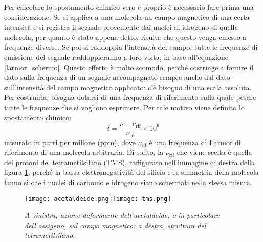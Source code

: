 \documentclass{report}
\newcommand{\figref}[1]{figura \ref{#1}}
\renewcommand{\eqref}[1]{equazione \ref{#1}}
\numberwithin{equation}{section}
\numberwithin{figure}{section}
\begin{document}
Per calcolare lo spostamento chimico vero e proprio è necessario fare prima una considerazione. Se si applica a una molecola un campo magnetico di una certa intensità e si registra il segnale proveniente dai nuclei di idrogeno di quella molecola, per quanto è stato appena detto, risulta che questo venga emesso a frequenze diverse. Se poi si raddoppia l'intensità del campo, tutte le frequenze di emissione del segnale raddoppieranno a loro volta, in base all'\eqref{larmor_schermo}. Questo effetto è molto scomodo, perché costringe a fornire il dato sulla frequenza di un segnale accompagnato sempre anche dal dato sull'intensità del campo magnetico applicato: c'è bisogno di una scala assoluta. Per costruirla, bisogna dotarsi di una frequenza di riferimento sulla quale pesare tutte le frequenze che si vogliono esprimere. Per tale motivo viene definito lo spostamento chimico:
\begin{equation}
    \boxed{\delta = \dfrac{\nu - \nu_{\mathrm{rif}}}{\nu_{\mathrm{rif}}} \times 10^6}
\end{equation}
misurato in parti per milione (ppm), dove $\nu_{\mathrm{rif}}$ è una frequenza di Larmor di riferimento di una molecola arbitraria. Di solito, la $\nu_{\mathrm{rif}}$ che viene scelta è quella dei protoni del tetrametilsilano (TMS), raffigurato nell'immagine di destra della \figref{fig:tms}, perché la bassa elettronegatività del silicio e la simmetria della molecola fanno sì che i nuclei di carbonio e idrogeno siano schermati nella stessa misura.

\begin{figure}[htp]
\centering
\texttt{[image: acetaldeide.png]}\quad\texttt{[image: tms.png]}
\caption{\label{fig:tms} \textit{A sinistra, azione deformante dell'acetaldeide, e in particolare dell'ossigeno, sul campo magnetico; a destra, struttura del tetrametilsilano}.}
\end{figure}
\end{document}
